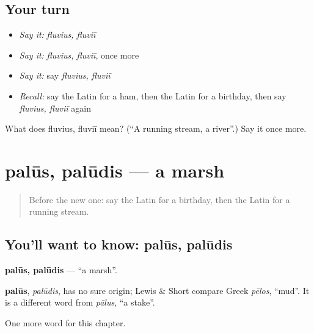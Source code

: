 \subsection*{Your turn}
\begin{itemize}
\raggedright
  \item \emph{Say it:} \emph{fluvius, fluviī}
  \item \emph{Say it:} \emph{fluvius, fluviī}, once more
  \item \emph{Say it:} say \emph{fluvius, fluviī}
  \item \emph{Recall:} say the Latin for a ham, then the Latin for a birthday, then say \emph{fluvius, fluviī} again
\end{itemize}

\begin{tcolorbox}[breakable,colback=teal!4,colframe=teal!35!black,title={Before you move on}]
What does fluvius, fluviī mean? (\textquotedblleft{}A running stream, a river\textquotedblright{}.) Say it once more.
\end{tcolorbox}
\section[palūs, palūdis]{palūs, palūdis — a marsh}

\label{lesson:LA-C196-palus}



\begin{quote}
Before the new one: say the Latin for a birthday, then the Latin for a running stream.
\end{quote}

\subsection*{You'll want to know: palūs, palūdis}
\textbf{palūs, palūdis} — \textquotedblleft{}a marsh\textquotedblright{}.

\begin{cousinweb}
\textbf{palūs}, \emph{palūdis}, has no sure origin; Lewis \& Short compare Greek \emph{pēlos}, \textquotedblleft{}mud\textquotedblright{}. It is a different word from \emph{pālus}, \textquotedblleft{}a stake\textquotedblright{}.
\end{cousinweb}

\begin{grammarlens}[title={What you've built}]
One more word for this chapter.
\end{grammarlens}

